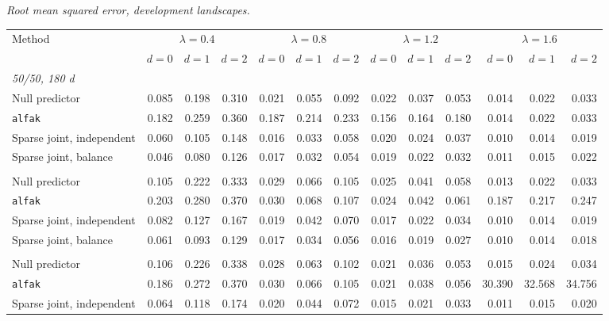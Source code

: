\noindent\textit{Root mean squared error, development landscapes.}
\begin{center}
\scriptsize
\setlength{\tabcolsep}{2.5pt}
\begin{tabular}{l*{12}{r}}
\toprule
Method & \multicolumn{3}{c}{$\lambda=0.4$} & \multicolumn{3}{c}{$\lambda=0.8$} & \multicolumn{3}{c}{$\lambda=1.2$} & \multicolumn{3}{c}{$\lambda=1.6$} \\
\cmidrule(lr){2-4}\cmidrule(lr){5-7}\cmidrule(lr){8-10}\cmidrule(lr){11-13}
 & $d=0$ & $d=1$ & $d=2$ & $d=0$ & $d=1$ & $d=2$ & $d=0$ & $d=1$ & $d=2$ & $d=0$ & $d=1$ & $d=2$ \\
\midrule
\multicolumn{13}{l}{\textit{50/50, 180 d}} \\
\quad Null predictor & 0.085 & 0.198 & 0.310 & 0.021 & 0.055 & 0.092 & 0.022 & 0.037 & 0.053 & 0.014 & 0.022 & 0.033 \\
\quad \texttt{alfak} & 0.182 & 0.259 & 0.360 & 0.187 & 0.214 & 0.233 & 0.156 & 0.164 & 0.180 & 0.014 & 0.022 & 0.033 \\
\quad Sparse joint, independent & 0.060 & 0.105 & 0.148 & 0.016 & 0.033 & 0.058 & 0.020 & 0.024 & 0.037 & 0.010 & 0.014 & 0.019 \\
\quad Sparse joint, balance & 0.046 & 0.080 & 0.126 & 0.017 & 0.032 & 0.054 & 0.019 & 0.022 & 0.032 & 0.011 & 0.015 & 0.022 \\
\addlinespace[2pt]
\multicolumn{13}{l}{\textit{200/200, 180 d}} \\
\quad Null predictor & 0.105 & 0.222 & 0.333 & 0.029 & 0.066 & 0.105 & 0.025 & 0.041 & 0.058 & 0.013 & 0.022 & 0.033 \\
\quad \texttt{alfak} & 0.203 & 0.280 & 0.370 & 0.030 & 0.068 & 0.107 & 0.024 & 0.042 & 0.061 & 0.187 & 0.217 & 0.247 \\
\quad Sparse joint, independent & 0.082 & 0.127 & 0.167 & 0.019 & 0.042 & 0.070 & 0.017 & 0.022 & 0.034 & 0.010 & 0.014 & 0.019 \\
\quad Sparse joint, balance & 0.061 & 0.093 & 0.129 & 0.017 & 0.034 & 0.056 & 0.016 & 0.019 & 0.027 & 0.010 & 0.014 & 0.018 \\
\addlinespace[2pt]
\multicolumn{13}{l}{\textit{200/200, 360 d}} \\
\quad Null predictor & 0.106 & 0.226 & 0.338 & 0.028 & 0.063 & 0.102 & 0.021 & 0.036 & 0.053 & 0.015 & 0.024 & 0.034 \\
\quad \texttt{alfak} & 0.186 & 0.272 & 0.370 & 0.030 & 0.066 & 0.105 & 0.021 & 0.038 & 0.056 & 30.390 & 32.568 & 34.756 \\
\quad Sparse joint, independent & 0.064 & 0.118 & 0.174 & 0.020 & 0.044 & 0.072 & 0.015 & 0.021 & 0.033 & 0.011 & 0.015 & 0.020 \\

\end{tabular}
\end{center}
